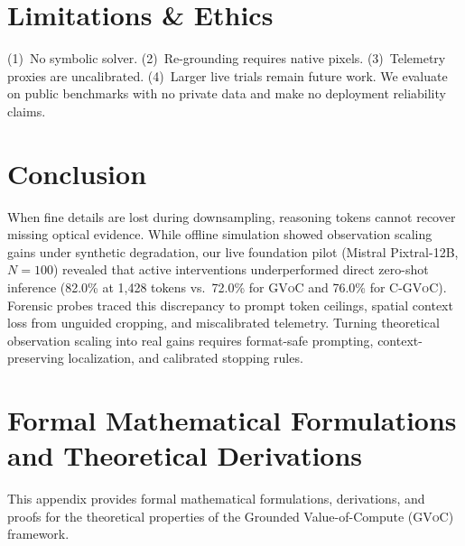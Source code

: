 \documentclass[11pt]{article}
\begin{document}
\section{Limitations \& Ethics}
\label{sec:limitations}
(1)~No symbolic solver. (2)~Re-grounding requires native pixels. (3)~Telemetry proxies are uncalibrated. (4)~Larger live trials remain future work. We evaluate on public benchmarks with no private data and make no deployment reliability claims.

\section{Conclusion}
\label{sec:conclusion}
When fine details are lost during downsampling, reasoning tokens cannot recover missing optical evidence. While offline simulation showed observation scaling gains under synthetic degradation, our live foundation pilot (Mistral Pixtral-12B, $N=100$) revealed that active interventions underperformed direct zero-shot inference (82.0\% at 1,428 tokens vs.\ 72.0\% for \textsc{GVoC} and 76.0\% for C-\textsc{GVoC}). Forensic probes traced this discrepancy to prompt token ceilings, spatial context loss from unguided cropping, and miscalibrated telemetry. Turning theoretical observation scaling into real gains requires format-safe prompting, context-preserving localization, and calibrated stopping rules.

\clearpage

\begingroup
\renewcommand{\bibfont}{\footnotesize}
\setlength{\bibsep}{0.5pt}

\endgroup

\clearpage
\appendix

\section{Formal Mathematical Formulations and Theoretical Derivations}
\label{app:proofs}

This appendix provides formal mathematical formulations, derivations, and proofs for the theoretical properties of the Grounded Value-of-Compute (\textsc{GVoC}) framework.
\end{document}
